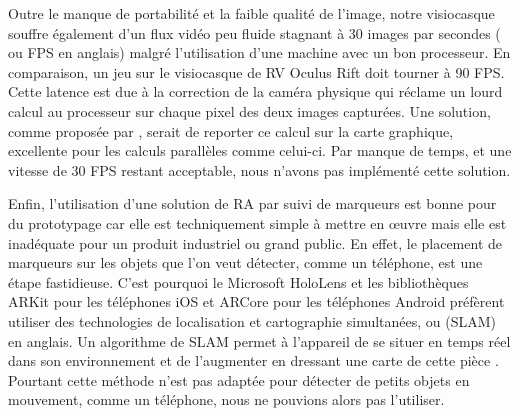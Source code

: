 Outre le manque de portabilité et la faible qualité de l'image, notre visiocasque souffre également d'un flux vidéo peu fluide stagnant à 30 images par secondes ( ou FPS en anglais) malgré l'utilisation d'une machine avec un bon processeur. En comparaison, un jeu sur le visiocasque de RV Oculus Rift doit tourner à 90 FPS. Cette latence est due à la correction de la caméra physique qui réclame un lourd calcul au processeur sur chaque pixel des deux images capturées. Une solution, comme proposée par \cite{Steptoe2013}, serait de reporter ce calcul sur la carte graphique, excellente pour les calculs parallèles comme celui-ci. Par manque de temps, et une vitesse de 30 FPS restant acceptable, nous n'avons pas implémenté cette solution.


Enfin, l'utilisation d'une solution de RA par suivi de marqueurs est bonne pour du prototypage car elle est techniquement simple à mettre en \oe uvre mais elle est inadéquate pour un produit industriel ou grand public. En effet, le placement de marqueurs sur les objets que l'on veut détecter, comme un téléphone, est une étape fastidieuse. C'est pourquoi le Microsoft HoloLens et les bibliothèques ARKit pour les téléphones iOS et ARCore pour les téléphones Android préfèrent utiliser des technologies de localisation et cartographie simultanées, ou  (SLAM) en anglais. Un algorithme de SLAM permet à l'appareil de se situer en temps réel dans son environnement et de l'augmenter en dressant une carte de cette pièce . Pourtant cette méthode n'est pas adaptée pour détecter de petits objets en mouvement, comme un téléphone, nous ne pouvions alors pas l'utiliser.



